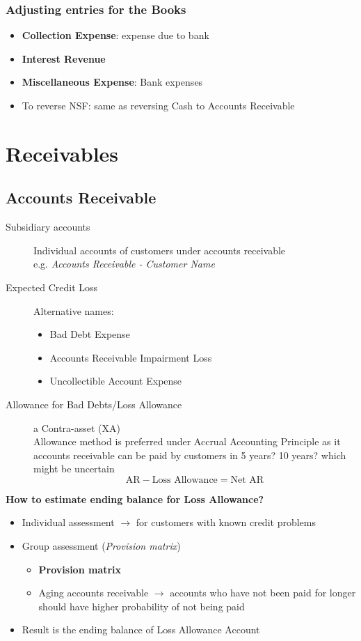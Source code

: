 \documentclass{article}
\begin{document}
\begin{multicols}{2}
\subsubsection{Adjusting entries for the Books}
\begin{itemize}
	\item \textbf{Collection Expense}: expense due to bank
	\item \textbf{Interest Revenue}
	\item \textbf{Miscellaneous Expense}: Bank expenses
	\item To reverse NSF: same as reversing Cash to Accounts Receivable
\end{itemize}
\section{Receivables}
\subsection{Accounts Receivable}
\begin{description}
	\item[Subsidiary accounts] Individual accounts of customers under accounts receivable\\
	e.g. \textit{Accounts Receivable - Customer Name}
	\item[Expected Credit Loss] Alternative names:
	\begin{itemize}
		\item Bad Debt Expense
		\item Accounts Receivable Impairment Loss
		\item Uncollectible Account Expense
	\end{itemize}
    \item[Allowance for Bad Debts/Loss Allowance] a Contra-asset (XA)\\
    Allowance method is preferred under Accrual Accounting Principle as it accounts receivable can be paid by customers in 5 years? 10 years? which might be uncertain
    $$\text{AR} - \text{Loss Allowance} = \text{Net AR}$$
\end{description}
\textbf{How to estimate ending balance for Loss Allowance?}
\begin{itemize}
	\item Individual assessment $\rightarrow$ for customers with known credit problems
	\item Group assessment (\textit{Provision matrix})
	\begin{itemize}
		\item \textbf{Provision matrix}
		\item Aging accounts receivable $\rightarrow$ accounts who have not been paid for longer should have higher probability of not being paid
	\end{itemize}
    \item Result is the ending balance of Loss Allowance Account
\end{itemize}

\end{multicols}
\end{document}
